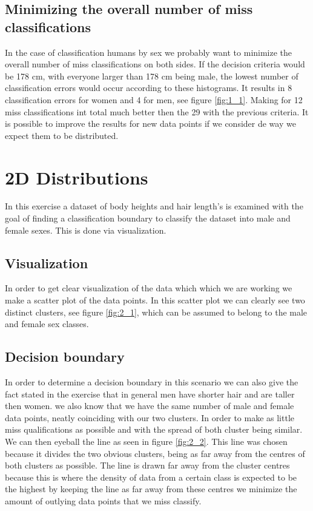 \documentclass[10pt,a4paper]{article}
\begin{document}
\subsection{Minimizing the overall number of miss classifications}
In the case of classification humans by sex we probably want to minimize the overall number of miss classifications on both sides. If the decision criteria would be 178 cm, with everyone larger than 178 cm being male, the lowest number of classification errors would occur according to these histograms. It results in 8 classification errors for women and 4 for men, see figure \ref{fig:1_1}. Making for 12 miss classifications int total much better then the 29 with the previous criteria. It is possible to improve the results for new data points if we consider de way we expect them to be distributed.

\section{2D Distributions}
In this exercise a dataset of body heights and hair length's is examined with the goal of finding a classification boundary to classify the dataset into male and female sexes. This is done via visualization.

\subsection{Visualization}
In order to get clear visualization of the data which which we are working we make a scatter plot of the data points. In this scatter plot we can clearly see two distinct clusters, see figure \ref{fig:2_1}, which can be assumed to belong to the male and female sex classes.

\subsection{Decision boundary}
In order to determine a decision boundary in this scenario we can also give the fact stated in the exercise that in general men have shorter hair and are taller then women. we also know that we have the same number of male and female data points, neatly coinciding with our two clusters. In order to make as little miss qualifications as possible and with the spread of both cluster being similar. We can then eyeball the line as seen in figure \ref{fig:2_2}. This line was chosen because it divides the two obvious clusters, being as far away from the centres of both clusters as possible. The line is drawn far away from the cluster centres because this is where the density of data from a certain class is expected to be the highest by keeping the line as far away from these centres we minimize the amount of outlying data points that we miss classify.
\end{document}
